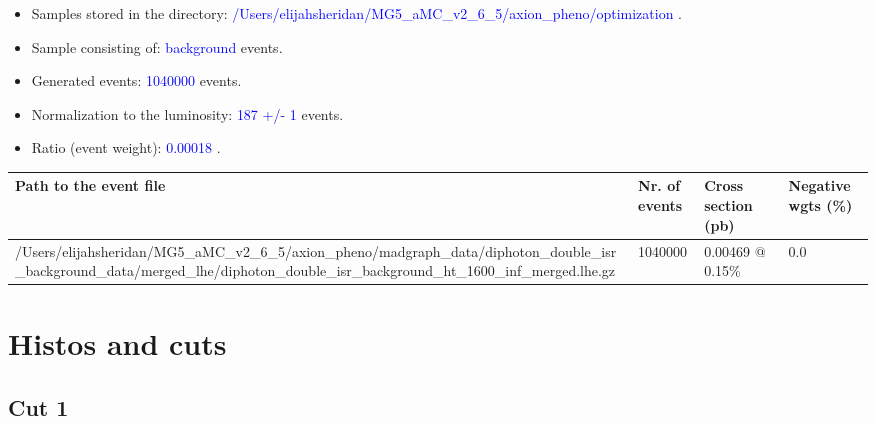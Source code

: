 \documentclass[a4paper, 10pt]{article}
\begin{document}
\begin{itemize}
  \item Samples stored in the directory: \textcolor{blue}{/\-Users/\-elijahsheridan/\-MG5\_aMC\_v2\_6\_5/\-axion\_pheno/\-optimization} .
   \item Sample consisting of: \textcolor{blue}{background}  events.
   \item Generated events: \textcolor{blue}{1040000 }  events.
   \item Normalization to the luminosity: \textcolor{blue}{187}\textcolor{blue}{ +/\-- }\textcolor{blue}{1 }  events.
   \item Ratio (event weight): \textcolor{blue}{0.00018 } .  
 
\end{itemize}
\begin{table}[H]
  \begin{center}
    \begin{tabular}{|m{55.0mm}|m{25.0mm}|m{30.0mm}|m{30.0mm}|}
      \hline
      {\cellcolor{yellow}         Path to the event file}& {\cellcolor{yellow}         Nr. of events}& {\cellcolor{yellow}         Cross section (pb)}& {\cellcolor{yellow}         Negative wgts (\%)}\\
      \hline
      {\cellcolor{white}          /\-Users/\-elijahsheridan/\-MG5\_aMC\_v2\_6\_5/\-axion\_pheno/\-madgraph\_data/\-diphoton\_double\_isr\_background\_data/\-merged\_lhe/\-diphoton\_double\_isr\_background\_ht\_1600\_inf\_merged.lhe.gz}& {\cellcolor{white}          1040000}& {\cellcolor{white}          0.00469 @ 0.15\%}& {\cellcolor{white}          0.0}\\
\hline
    \end{tabular}
  \end{center}
\end{table}

\newpage
\section{ Histos and cuts}

\subsection{Cut 1}
\end{document}
